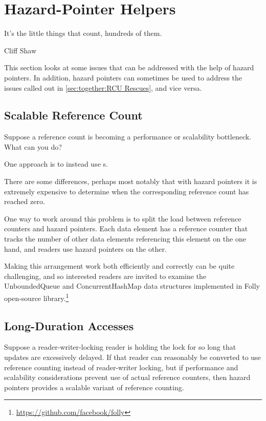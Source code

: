 
\section{Hazard-Pointer Helpers}
\label{sec:together:Hazard-Pointer Helpers}
%
\epigraph{It's the little things that count, hundreds of them.}
	 {Cliff Shaw}

This section looks at some issues that can be addressed with the
help of hazard pointers.
In addition, hazard pointers can sometimes be used to address the
issues called out in \cref{sec:together:RCU Rescues}, and vice versa.

\subsection{Scalable Reference Count}
\label{sec:together:Scalable Reference Count}

Suppose a reference count is becoming a performance or scalability
bottleneck.
What can you do?

One approach is to instead use s.

There are some differences, perhaps most notably that with
hazard pointers it is extremely expensive to determine when
the corresponding reference count has reached zero.

One way to work around this problem is to split the load between
reference counters and hazard pointers.
Each data element has a reference counter that tracks the number
of other data elements referencing this element on the one hand,
and readers use hazard pointers on the other.

Making this arrangement work both efficiently and correctly can be
quite challenging, and so interested readers are invited to examine
the UnboundedQueue and ConcurrentHashMap data structures implemented in
Folly open-source library.\footnote{
	\url{https://github.com/facebook/folly}}

\subsection{Long-Duration Accesses}
\label{sec:together:Long-Duration Accesses}

Suppose a reader-writer-locking reader is holding the lock for so
long that updates are excessively delayed.
If that reader can reasonably be converted to use reference counting
instead of reader-writer locking, but if performance and scalability
considerations prevent use of actual reference counters, then hazard
pointers provides a scalable variant of reference counting.

